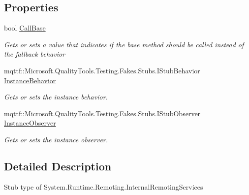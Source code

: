 \subsection*{Properties}
\begin{DoxyCompactItemize}
\item 
bool \hyperlink{class_system_1_1_runtime_1_1_remoting_1_1_fakes_1_1_stub_internal_remoting_services_a74b95fe78c328fffb3c467d277be933b}{Call\-Base}
\begin{DoxyCompactList}\small\item\em Gets or sets a value that indicates if the base method should be called instead of the fallback behavior\end{DoxyCompactList}\item 
mqttf\-::\-Microsoft.\-Quality\-Tools.\-Testing.\-Fakes.\-Stubs.\-I\-Stub\-Behavior \hyperlink{class_system_1_1_runtime_1_1_remoting_1_1_fakes_1_1_stub_internal_remoting_services_a1bb120bde9d70c1ab226ba063cb1f412}{Instance\-Behavior}
\begin{DoxyCompactList}\small\item\em Gets or sets the instance behavior.\end{DoxyCompactList}\item 
mqttf\-::\-Microsoft.\-Quality\-Tools.\-Testing.\-Fakes.\-Stubs.\-I\-Stub\-Observer \hyperlink{class_system_1_1_runtime_1_1_remoting_1_1_fakes_1_1_stub_internal_remoting_services_a55902da318f11b04d8b7e7612108d7bb}{Instance\-Observer}
\begin{DoxyCompactList}\small\item\em Gets or sets the instance observer.\end{DoxyCompactList}\end{DoxyCompactItemize}


\subsection{Detailed Description}
Stub type of System.\-Runtime.\-Remoting.\-Internal\-Remoting\-Services




